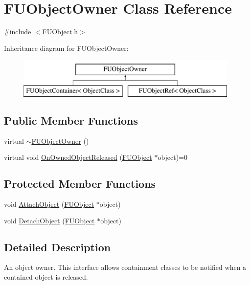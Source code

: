 \hypertarget{classFUObjectOwner}{
\section{FUObjectOwner Class Reference}
\label{classFUObjectOwner}
}


{\ttfamily \#include $<$FUObject.h$>$}

Inheritance diagram for FUObjectOwner:\begin{figure}[H]
\begin{center}
\leavevmode
\includegraphics[height=2.000000cm]{classFUObjectOwner}
\end{center}
\end{figure}
\subsection*{Public Member Functions}
\begin{DoxyCompactItemize}
\item 
virtual \hyperlink{classFUObjectOwner_a79a7c5937cccf9dc0a94b4e0b88f9885}{$\sim$FUObjectOwner} ()
\item 
virtual void \hyperlink{classFUObjectOwner_a4220f8365226a68c4786b63430966e2d}{OnOwnedObjectReleased} (\hyperlink{classFUObject}{FUObject} $\ast$object)=0
\end{DoxyCompactItemize}
\subsection*{Protected Member Functions}
\begin{DoxyCompactItemize}
\item 
void \hyperlink{classFUObjectOwner_a4269121cd3d462855112c0c8532c3bb0}{AttachObject} (\hyperlink{classFUObject}{FUObject} $\ast$object)
\item 
void \hyperlink{classFUObjectOwner_ae357cb997c37543ed1f7e055358c4ae5}{DetachObject} (\hyperlink{classFUObject}{FUObject} $\ast$object)
\end{DoxyCompactItemize}


\subsection{Detailed Description}
An object owner. This interface allows containment classes to be notified when a contained object is released. 


